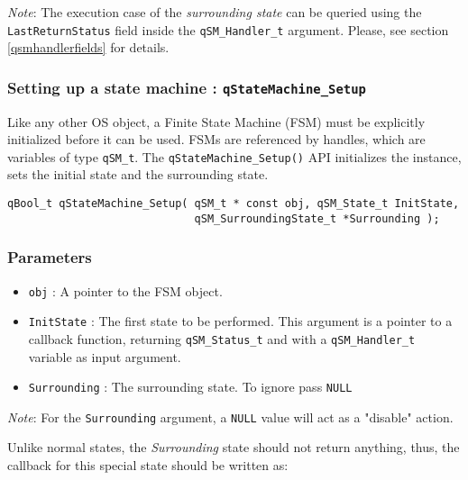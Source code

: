 \begin{tcolorbox}
\ArrowBoldDownRight \textit{Note}: The execution case of the \textit{surrounding state} can be queried using the \lstinline{LastReturnStatus} field inside the \lstinline{qSM_Handler_t} argument. Please, see section \ref{qsmhandlerfields} for details.
\end{tcolorbox}

\subsubsection{Setting up a state machine : \texorpdfstring{\lstinline{qStateMachine_Setup}}{qStateMachine_Setup} }
Like any other OS object, a Finite State Machine (FSM) must be explicitly initialized before it can be used. FSMs are referenced by handles, which are variables of type \lstinline{qSM_t}. 
The \lstinline{qStateMachine_Setup()} API   initializes the instance, sets the initial state and the surrounding state.
\medskip

\begin{lstlisting}[style=CStyle]
qBool_t qStateMachine_Setup( qSM_t * const obj, qSM_State_t InitState, 
                             qSM_SurroundingState_t *Surrounding );
\end{lstlisting}

\subsubsection*{Parameters}
\begin{itemize}
    \item \lstinline{obj} : A pointer to the FSM object.
    \item \lstinline{InitState} :  The first state to be performed. This argument is a pointer to a callback function, returning \lstinline{qSM_Status_t} and with a \lstinline{qSM_Handler_t} variable as input argument.
    \item \lstinline{Surrounding} : The surrounding state. To ignore pass \lstinline{NULL}   
\end{itemize}  

\begin{tcolorbox}
\ArrowBoldDownRight \textit{Note}: For the \lstinline{Surrounding} argument, a \lstinline{NULL} value will act as a "disable" action.
\end{tcolorbox}

Unlike normal states, the \textit{Surrounding} state should not return anything, thus, the callback for this special state should be written as:
\medskip


